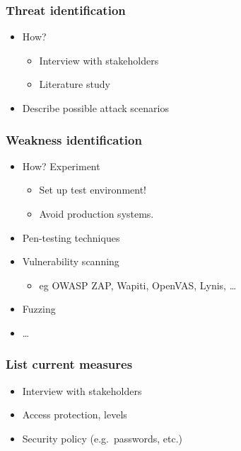\documentclass[aspectratio=169]{beamer}
\begin{document}
\begin{frame}
    \frametitle{Threat identification}
    
    \begin{itemize}
       \item How?
       \begin{itemize}
           \item Interview with stakeholders
           \item Literature study
       \end{itemize}
       \item Describe possible attack scenarios
    \end{itemize}
    
\end{frame}

\begin{frame}
    \frametitle{Weakness identification}
    
    \begin{itemize}
       \item How? Experiment
       \begin{itemize}
           \item Set up test environment!
           \item Avoid production systems.
       \end{itemize}
       \item Pen-testing techniques
       \item Vulnerability scanning
       \begin{itemize}
           \item eg OWASP ZAP, Wapiti, OpenVAS, Lynis, \ldots
       \end{itemize}
       \item Fuzzing
       \item \ldots
    \end{itemize}
    
\end{frame}

\begin{frame}
    \frametitle{List current measures}    
    \begin{itemize}
        \item Interview with stakeholders
        \item Access protection, levels
        \item Security policy (e.g.\ passwords, etc.)
    \end{itemize}
    
\end{frame}
\end{document}
